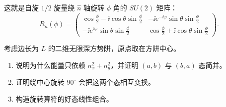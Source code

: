 \begin{solution}
	这就是自旋 $1/2$ 旋量绕 $\hat n$ 轴旋转 $\phi$ 角的 $SU(2)$ 矩阵：
	\[
	\boxed{R_{\hat n}(\phi)=\begin{pmatrix}
	\cos\frac{\phi}{2}-\ii\cos\theta\sin\frac{\phi}{2}&-\ii e^{-\ii\varphi}\sin\theta\sin\frac{\phi}{2}\\
	-\ii e^{\ii\varphi}\sin\theta\sin\frac{\phi}{2}&\cos\frac{\phi}{2}+\ii\cos\theta\sin\frac{\phi}{2}
	\end{pmatrix}}.
	\]
	\end{solution}

\begin{question}
考虑边长为 $L$ 的二维无限深方势阱，原点取在方阱中心。
\begin{enumerate}
\item 说明为什么能量只依赖 $n_x^2+n_y^2$，并证明 $(a,b)$ 与 $(b,a)$ 态简并。
\item 证明绕中心旋转 $90^\circ$ 会把这两个态相互变换。
\item 构造旋转算符的好态线性组合。
\end{enumerate}
\end{question}
